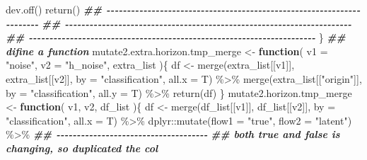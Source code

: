 \documentclass[
]{article}
\newenvironment{Shaded}{\begin{snugshade}}{\end{snugshade}}
\newcommand{\AttributeTok}[1]{\textcolor[rgb]{0.77,0.63,0.00}{#1}}
\newcommand{\ControlFlowTok}[1]{\textcolor[rgb]{0.13,0.29,0.53}{\textbf{#1}}}
\newcommand{\DocumentationTok}[1]{\textcolor[rgb]{0.56,0.35,0.01}{\textbf{\textit{#1}}}}
\newcommand{\FunctionTok}[1]{\textcolor[rgb]{0.00,0.00,0.00}{#1}}
\newcommand{\NormalTok}[1]{#1}
\newcommand{\OtherTok}[1]{\textcolor[rgb]{0.56,0.35,0.01}{#1}}
\newcommand{\SpecialCharTok}[1]{\textcolor[rgb]{0.00,0.00,0.00}{#1}}
\newcommand{\StringTok}[1]{\textcolor[rgb]{0.31,0.60,0.02}{#1}}
\begin{document}
\begin{Shaded}
\begin{Highlighting}[]
    \FunctionTok{dev.off}\NormalTok{()}
    \FunctionTok{return}\NormalTok{()}
    \DocumentationTok{\#\# {-}{-}{-}{-}{-}{-}{-}{-}{-}{-}{-}{-}{-}{-}{-}{-}{-}{-}{-}{-}{-}{-}{-}{-}{-}{-}{-}{-}{-}{-}{-}{-}{-}{-}{-}{-}{-}{-}{-}{-}{-}{-}{-}{-}{-}{-}{-}{-}{-}{-}{-}{-}{-}{-}{-}{-}{-}{-}{-}{-}{-}{-}{-}{-}{-}{-}{-}{-}{-}{-} }
    \DocumentationTok{\#\# {-}{-}{-}{-}{-}{-}{-}{-}{-}{-}{-}{-}{-}{-}{-}{-}{-}{-}{-}{-}{-}{-}{-}{-}{-}{-}{-}{-}{-}{-}{-}{-}{-}{-}{-}{-}{-}{-}{-}{-}{-}{-}{-}{-}{-}{-}{-}{-}{-}{-}{-}{-}{-}{-}{-}{-}{-}{-}{-}{-}{-}{-}{-}{-}{-}{-}{-}{-}{-}{-} }
    \DocumentationTok{\#\# {-}{-}{-}{-}{-}{-}{-}{-}{-}{-}{-}{-}{-}{-}{-}{-}{-}{-}{-}{-}{-}{-}{-}{-}{-}{-}{-}{-}{-}{-}{-}{-}{-}{-}{-}{-}{-}{-}{-}{-}{-}{-}{-}{-}{-}{-}{-}{-}{-}{-}{-}{-}{-}{-}{-}{-}{-}{-}{-}{-}{-}{-}{-}{-}{-}{-}{-}{-}{-}{-} }
\NormalTok{  \}}
\DocumentationTok{\#\# difine a function}
\NormalTok{mutate2.extra.horizon.tmp\_merge }\OtherTok{\textless{}{-}} 
  \ControlFlowTok{function}\NormalTok{(}
           \AttributeTok{v1 =} \StringTok{"noise"}\NormalTok{,}
           \AttributeTok{v2 =} \StringTok{"h\_noise"}\NormalTok{,}
\NormalTok{           extra\_list}
\NormalTok{           )\{}
\NormalTok{    df }\OtherTok{\textless{}{-}} \FunctionTok{merge}\NormalTok{(extra\_list[[v1]], extra\_list[[v2]],}
                              \AttributeTok{by =} \StringTok{"classification"}\NormalTok{, }\AttributeTok{all.x =}\NormalTok{ T) }\SpecialCharTok{\%\textgreater{}\%} 
      \FunctionTok{merge}\NormalTok{(extra\_list[[}\StringTok{"origin"}\NormalTok{]], }\AttributeTok{by =} \StringTok{"classification"}\NormalTok{, }\AttributeTok{all.y =}\NormalTok{ T) }\SpecialCharTok{\%\textgreater{}\%} 
    \FunctionTok{return}\NormalTok{(df)}
\NormalTok{  \}}
\NormalTok{mutate2.horizon.tmp\_merge }\OtherTok{\textless{}{-}}
  \ControlFlowTok{function}\NormalTok{(}
\NormalTok{           v1,}
\NormalTok{           v2,}
\NormalTok{           df\_list}
\NormalTok{           )\{}
\NormalTok{  df }\OtherTok{\textless{}{-}} \FunctionTok{merge}\NormalTok{(df\_list[[v1]], df\_list[[v2]],}
                    \AttributeTok{by =} \StringTok{"classification"}\NormalTok{, }\AttributeTok{all.x =}\NormalTok{ T) }\SpecialCharTok{\%\textgreater{}\%} 
\NormalTok{  dplyr}\SpecialCharTok{::}\FunctionTok{mutate}\NormalTok{(}\AttributeTok{flow1 =} \StringTok{"true"}\NormalTok{, }\AttributeTok{flow2 =} \StringTok{"latent"}\NormalTok{) }\SpecialCharTok{\%\textgreater{}\%} 
  \DocumentationTok{\#\# {-}{-}{-}{-}{-}{-}{-}{-}{-}{-}{-}{-}{-}{-}{-}{-}{-}{-}{-}{-}{-}{-}{-}{-}{-}{-}{-}{-}{-}{-}{-}{-}{-}{-}{-}{-}{-} }
  \DocumentationTok{\#\# both true and false is changing, so duplicated the col}

\end{Highlighting}
\end{Shaded}
\end{document}
